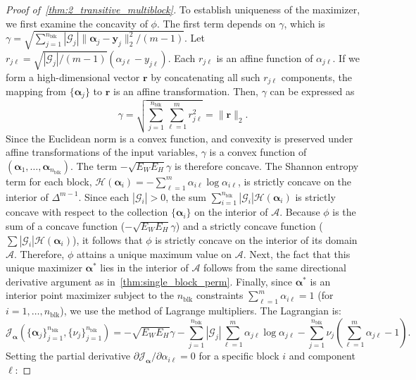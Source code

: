 \documentclass[11pt]{article}
\begin{document}
\begin{proof}[Proof of~\cref{thm:2_transitive_multiblock}]
To establish uniqueness of the maximizer, we first examine the concavity of \(\phi\).
The first term depends on \(\gamma\), which is \(\gamma = \sqrt{\sum_{j=1}^{n_{\mathrm{blk}}}|\mathcal G_j|\|\boldsymbol{\alpha}_j-\boldsymbol{y}_j\|_{2}^{2}/(m-1)}\).
Let \(r_{j\ell} = \sqrt{|\mathcal G_j|/(m-1)}(\alpha_{j\ell}-y_{j\ell})\). Each \(r_{j\ell}\) is an affine function of \(\alpha_{j\ell}\). If we form a high-dimensional vector \(\boldsymbol{r}\) by concatenating all such \(r_{j\ell}\) components, the mapping from \(\{\boldsymbol{\alpha}_j\}\) to \(\boldsymbol{r}\) is an affine transformation.
Then, \(\gamma\) can be expressed as
\[ \gamma = \sqrt{\sum_{j=1}^{n_{\mathrm{blk}}}\sum_{\ell=1}^m r_{j\ell}^2} = \|\boldsymbol{r}\|_2. \]
Since the Euclidean norm is a convex function, and convexity is preserved under affine transformations of the input variables, \(\gamma\) is a convex function of \((\boldsymbol{\alpha}_1, \ldots, \boldsymbol{\alpha}_{n_{\mathrm{blk}}})\).
The term \(-\sqrt{E_W E_H}\gamma\) is therefore concave.
The Shannon entropy term for each block, \(\mathcal{H}(\boldsymbol{\alpha}_i) = -\sum_{\ell=1}^m \alpha_{i\ell}\log\alpha_{i\ell}\), is strictly concave on the interior of \(\Delta^{m-1}\). Since each \(|\mathcal G_i| > 0\), the sum \(\sum_{i=1}^{n_{\mathrm{blk}}} |\mathcal G_i|\mathcal{H}(\boldsymbol{\alpha}_i)\) is strictly concave with respect to the collection \(\{\boldsymbol{\alpha}_i\}\) on the interior of \(\mathcal{A}\).
Because \(\phi\) is the sum of a concave function (\(-\sqrt{E_W E_H}\gamma\)) and a strictly concave function (\(\sum |\mathcal G_i|\mathcal{H}(\boldsymbol{\alpha}_i)\)), it follows that \(\phi\) is strictly concave on the interior of its domain \(\mathcal{A}\).
Therefore, \(\phi\) attains a unique maximum value on \(\mathcal{A}\).
Next, the fact that this unique maximizer \(\boldsymbol{\alpha}^*\) lies in the interior of \(\mathcal{A}\) follows from the same directional derivative argument as in~\cref{thm:single_block_perm}.
Finally, since \(\boldsymbol{\alpha}^*\) is an interior point maximizer subject to the \(n_{\mathrm{blk}}\) constraints \(\sum_{\ell=1}^m \alpha_{i\ell}=1\) (for \(i=1,\dots,n_{\mathrm{blk}}\)), we use the method of Lagrange multipliers. The Lagrangian is:
\[ \mathscr{J}_{\boldsymbol{\alpha}}(\{\boldsymbol{\alpha}_j\}_{j=1}^{n_{\mathrm{blk}}}, \{\nu_j\}_{j=1}^{n_{\mathrm{blk}}}) = -\sqrt{E_W E_H}\gamma - \sum_{j=1}^{n_{\mathrm{blk}}} |\mathcal G_j|\sum_{\ell=1}^m \alpha_{j\ell}\log\alpha_{j\ell} - \sum_{j=1}^{n_{\mathrm{blk}}} \nu_j \left(\sum_{\ell=1}^m \alpha_{j\ell}-1\right). \]
Setting the partial derivative \(\partial \mathscr{J}_{\boldsymbol{\alpha}}/\partial \alpha_{i\ell} = 0\) for a specific block \(i\) and component \(\ell\):

\end{proof}
\end{document}
